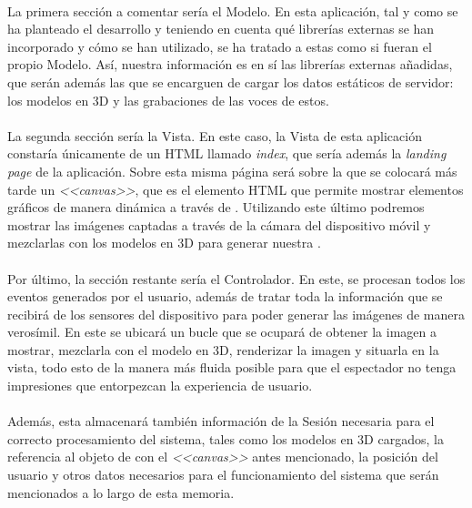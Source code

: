 \documentclass{subfiles}
\begin{document}
        \paragraph{}
        La primera sección a comentar sería el Modelo. En esta aplicación, tal y como se ha planteado el desarrollo y teniendo en cuenta qué librerías externas se han incorporado y cómo se han utilizado, se ha tratado a estas como si fueran el propio Modelo. Así, nuestra información es en sí las librerías externas añadidas, que serán además las que se encarguen de cargar los datos estáticos de servidor: los modelos en 3D y las grabaciones de las voces de estos.

        \paragraph{}
        La segunda sección sería la Vista. En este caso, la Vista de esta aplicación constaría únicamente de un HTML llamado \textit{index}, que sería además la \textit{landing page} de la aplicación. Sobre esta misma página será sobre la que se colocará más tarde un \textit{<<canvas>>}, que es el elemento HTML que permite mostrar elementos gráficos de manera dinámica a través de \js. Utilizando este último podremos mostrar las imágenes captadas a través de la cámara del dispositivo móvil y mezclarlas con los modelos en 3D para generar nuestra \ra.

        \paragraph{}
        Por último, la sección restante sería el Controlador. En este, se procesan todos los eventos generados por el usuario, además de tratar toda la información que se recibirá de los sensores del dispositivo para poder generar las imágenes de manera verosímil. En este se ubicará un bucle que se ocupará de obtener la imagen a mostrar, mezclarla con el modelo en 3D, renderizar la imagen y situarla en la vista, todo esto de la manera más fluida posible para que el espectador no tenga impresiones que entorpezcan la experiencia de usuario.

        \paragraph{}
        Además, esta almacenará también información de la Sesión necesaria para el correcto procesamiento del sistema, tales como los modelos en 3D cargados, la referencia al objeto de \js con el \textit{<<canvas>>} antes mencionado, la posición del usuario y otros datos necesarios para el funcionamiento del sistema que serán mencionados a lo largo de esta memoria.
\end{document}
